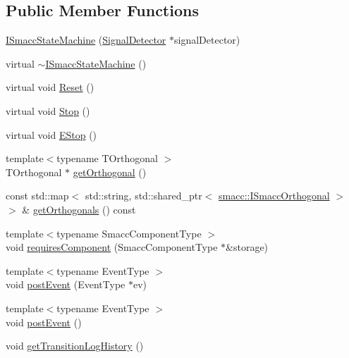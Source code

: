 \subsection*{Public Member Functions}
\begin{DoxyCompactItemize}
\item 
\hyperlink{classsmacc_1_1ISmaccStateMachine_a497c2185584adbec3298d4000277b75e}{I\+Smacc\+State\+Machine} (\hyperlink{classsmacc_1_1SignalDetector}{Signal\+Detector} $\ast$signal\+Detector)
\item 
virtual \hyperlink{classsmacc_1_1ISmaccStateMachine_a54bb9bac0008d3efc6a50cce88dce48e}{$\sim$\+I\+Smacc\+State\+Machine} ()
\item 
virtual void \hyperlink{classsmacc_1_1ISmaccStateMachine_ae175edef7aba48a1ac82e8401632c5fa}{Reset} ()
\item 
virtual void \hyperlink{classsmacc_1_1ISmaccStateMachine_a8f353fcf0686b1dacb57458da882c89b}{Stop} ()
\item 
virtual void \hyperlink{classsmacc_1_1ISmaccStateMachine_a3c5aab001d1bb7edcb37413404e4a7c2}{E\+Stop} ()
\item 
{\footnotesize template$<$typename T\+Orthogonal $>$ }\\T\+Orthogonal $\ast$ \hyperlink{classsmacc_1_1ISmaccStateMachine_a38b8b6e3d65b7de33020c9c397cf29bb}{get\+Orthogonal} ()
\item 
const std\+::map$<$ std\+::string, std\+::shared\+\_\+ptr$<$ \hyperlink{classsmacc_1_1ISmaccOrthogonal}{smacc\+::\+I\+Smacc\+Orthogonal} $>$ $>$ \& \hyperlink{classsmacc_1_1ISmaccStateMachine_a5b4dcb0a5135296cf3d728721ecd8053}{get\+Orthogonals} () const 
\item 
{\footnotesize template$<$typename Smacc\+Component\+Type $>$ }\\void \hyperlink{classsmacc_1_1ISmaccStateMachine_aa6b25e28f3bce24c4b356dc865a9eb7b}{requires\+Component} (Smacc\+Component\+Type $\ast$\&storage)
\item 
{\footnotesize template$<$typename Event\+Type $>$ }\\void \hyperlink{classsmacc_1_1ISmaccStateMachine_ad80cdd7bbc9a9f3b221c625754fed1ed}{post\+Event} (Event\+Type $\ast$ev)
\item 
{\footnotesize template$<$typename Event\+Type $>$ }\\void \hyperlink{classsmacc_1_1ISmaccStateMachine_a1549189caf29520514e677ca46f57348}{post\+Event} ()
\item 
void \hyperlink{classsmacc_1_1ISmaccStateMachine_ae7c08fc2addf8ee4785f721050e6a763}{get\+Transition\+Log\+History} ()

\end{DoxyCompactItemize}
